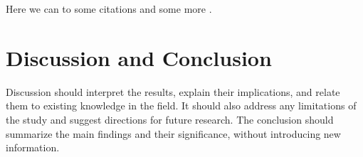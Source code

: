 \documentclass{forestrystudies}
\begin{document}
\blindtext[2]

Here we can to some \parencite{Baldocchi.gcb.12649} citations and some more \parencite{NoeSmear2015}.


\section*{Discussion and Conclusion}

Discussion should interpret the results, explain their implications, and relate them to existing knowledge in the field. It should also address any limitations of the study and suggest directions for future research. The conclusion should summarize the main findings and their significance, without introducing new information.

\printbibliography
\end{document}
